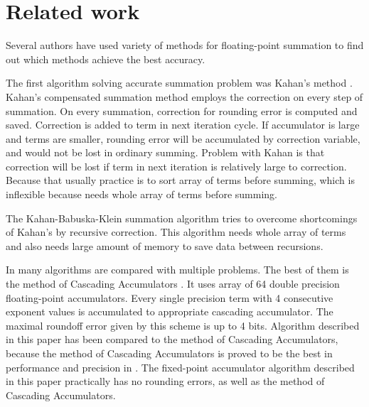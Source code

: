 \documentclass[conference]{IEEEtran}
\begin{document}
\section{Related work}
Several authors have used variety of methods for floating-point 
summation to find out which methods achieve the best accuracy. 
\par
The first algorithm solving accurate summation problem was Kahan's method \cite{ComparisonOfMethods}. 
Kahan's compensated summation method employs the correction 
on every step of summation. 
On every summation, correction for rounding error is computed and saved.
Correction is added to term in next iteration cycle.
If accumulator is large and terms are smaller, rounding error will be accumulated by correction variable, 
and would not be lost in ordinary summing.
Problem with Kahan is that correction will be lost if term in next iteration is relatively large to correction.
Because that usually practice is to sort array of terms before summing, 
which is inflexible because needs whole array of terms before summing.
\par
The Kahan-Babuska-Klein summation algorithm \cite{KahanBabuskaKlein} tries to overcome shortcomings of Kahan's by recursive correction.
This algorithm needs whole array of terms and also needs large amount of memory to save data between recursions.
\par
In \cite{ComparisonOfMethods} many algorithms are compared with multiple problems.
The best of them is the method of Cascading Accumulators \cite{CascadingAccumulators}.
It uses array of 64 double precision floating-point accumulators.
Every single precision term with 4 consecutive exponent values is accumulated to appropriate cascading accumulator.
The maximal roundoff error given by this scheme is up to 4 bits.
Algorithm described in this paper has been compared to the method of Cascading Accumulators,
because the method of Cascading Accumulators is proved 
to be the best in performance and precision in \cite{ComparisonOfMethods}.
The fixed-point accumulator algorithm described in this paper practically has no rounding errors,
as well as the method of Cascading Accumulators.
\end{document}
